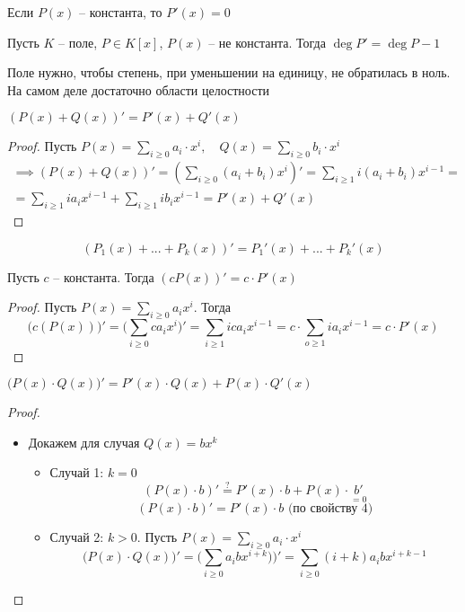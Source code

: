 \begin{props}
	\item Если $P(x)$ -- константа, то $P'(x) = 0$
    \item Пусть $K$ -- поле, $P \in K[x]$, $P(x)$ -- не константа. Тогда $\deg P' = \deg P - 1 $
    \begin{note}
    	Поле нужно, чтобы степень, при уменьшении на единицу, не обратилась в ноль. На самом деле достаточно области целостности
    \end{note}
    \item $(P(x) + Q(x))' = P'(x) + Q'(x)$
    \begin{proof}
        Пусть $P(x) = \sum_{i \ge 0} a_i \cdot x^i, \quad Q(x) = \sum_{i \ge 0}b_i \cdot x^i$
        \begin{multline*}
            \implies (P(x) + Q(x))' = (\sum_{i \ge 0}(a_i + b_i)x^i)' = \sum_{i \ge 1} i (a_i + b_i) x^{i - 1}  = \\ = \sum_{i \ge 1} i a_i x^{i - 1} + \sum_{i \ge 1} i b_i x^{i - 1} = P'(x) + Q'(x)
        \end{multline*}
    \end{proof}
    \begin{implication}
    	$$ (P_1(x) + ... + P_k(x))' = P_1'(x) + ... + P_k'(x) $$
    \end{implication}
    \item Пусть $c$ -- константа. Тогда $(cP(x))' = c \cdot P'(x) $
    \begin{proof}
        Пусть $P(x) = \sum_{i \ge 0} a_i x^i $. Тогда
        $$ \bigg(c(P(x))\bigg)' = \bigg(\sum_{i \ge 0} c a_i x^i\bigg)' = \sum_{i \ge 1} i c a_i x^{i-1} = c \cdot \sum_{o \ge 1} i a_i x^{i - 1} = c \cdot P'(x) $$
    \end{proof}
    \item $\bigg( P(x) \cdot Q(x) \bigg)' = P'(x) \cdot Q(x) + P(x) \cdot Q'(x) $
    \begin{proof}
        \hfill
        \begin{itemize}
    	\item Докажем для случая $ Q(x) = bx^k $
            \begin{itemize}
                \item Случай 1: $k = 0$
                $$ (P(x)\cdot b)' \stackrel?= P'(x) \cdot b + P(x) \cdot \underset{=0}{b'} $$
                $$ (P(x) \cdot b)' = P'(x) \cdot b \text{ (по свойству 4)} $$
                \item Случай 2: $k > 0 $. Пусть $P(x) = \sum_{i \ge 0} a_i \cdot x^i $
                $$ \bigg(P(x) \cdot Q(x)\bigg)' = \bigg( \sum_{i \ge 0} a_i b x^{i+k})\bigg)' = \sum_{i \ge 0} (i + k) a_i b x ^{i + k - 1} $$

\end{itemize}
\end{itemize}
\end{proof}
\end{props}
